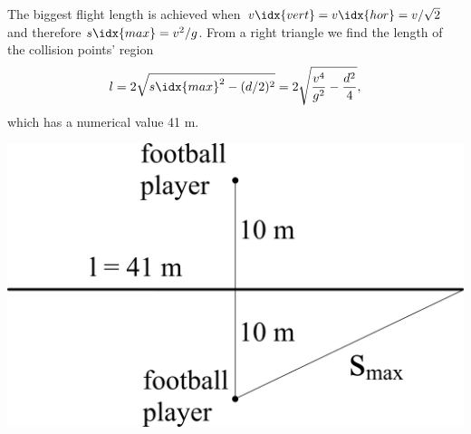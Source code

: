 {\[\] 
The biggest flight length is achieved when $v\idx{vert}=v\idx{hor}=v / \sqrt{2}$ and therefore $s\idx{max}=v^2 / g$. From a right triangle we find the length of the collision points’ region
\[
l=2\sqrt{{s\idx{max}}^2-(d/2)^2}=2\sqrt{\frac{v^4}{g^2}-\frac{d^2}{4}},
\] 
which has a numerical value 41 m. 
\begin{center}
\includegraphics[width=0.5\linewidth]{2013-v3g-09-jalgpallurid_ing}
\end{center}
\fi
}